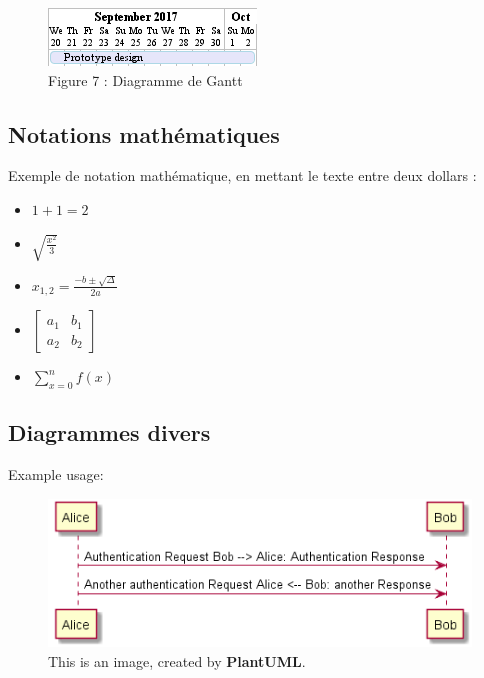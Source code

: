 \documentclass[
  10pt,
]{book}
\providecommand{\tightlist}{%
  \setlength{\itemsep}{0pt}\setlength{\parskip}{0pt}}
\begin{document}
\begin{figure}
\centering
\includegraphics{./tex2pdf.-1f50f5654d7493c4/cbe3c882ef3665a2ee8c9a5bb5d0327823462fe2.png}
\caption{Figure 7 : Diagramme de Gantt}
\end{figure}

\hypertarget{notations-mathuxe9matiques}{%
\subsection{Notations mathématiques}\label{notations-mathuxe9matiques}}

Exemple de notation mathématique, en mettant le texte entre deux dollars
:

\begin{itemize}
\tightlist
\item
  \(1 + 1 = 2\)
\item
  \(\sqrt{\frac{x^2}{3}}\)
\item
  \(x_{1,2} = \frac{- b \pm \sqrt{\Delta}}{2a}\)
\item
  \(\begin{bmatrix}  a_1 & b_1 \\  a_2 & b_2 \end{bmatrix}\)
\item
  \(\sum_{x=0}^n f(x)\)
\end{itemize}

\hypertarget{diagrammes-divers}{%
\subsection{Diagrammes divers}\label{diagrammes-divers}}

Example usage:

\begin{figure}
\centering
\includegraphics{./tex2pdf.-1f50f5654d7493c4/9824b34cea484ebda9342f4f8056531c58f33557.png}
\caption{This is an image, created by \textbf{PlantUML}.}
\end{figure}
\end{document}

